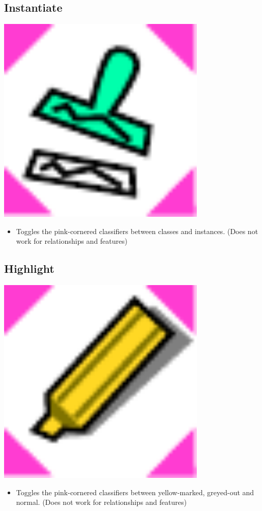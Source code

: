 \subsection{Instantiate}

\includegraphics[width=10cm]{../../gui/source/resources/edit_instantiate.pdf}
\begin{itemize}
\item Toggles the pink-cornered classifiers between classes and instances. (Does not work for relationships and features)
\end{itemize}

\subsection{Highlight}

\includegraphics[width=10cm]{../../gui/source/resources/edit_highlight.pdf}
\begin{itemize}
\item Toggles the pink-cornered classifiers between yellow-marked, greyed-out and normal. (Does not work for relationships and features)
\end{itemize}

